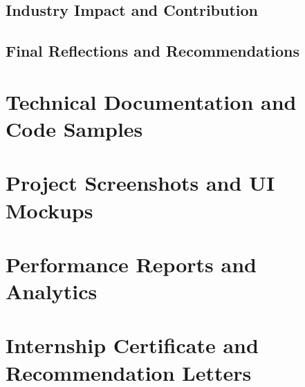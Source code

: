 \documentclass[a4paper, 11pt, oneside]{report}
\begin{document}
\section{Industry Impact and Contribution}
\section{Final Reflections and Recommendations}



\appendix
\chapter{Technical Documentation and Code Samples}

\chapter{Project Screenshots and UI Mockups}

\chapter{Performance Reports and Analytics}

\chapter{Internship Certificate and Recommendation Letters}



\end{document}
